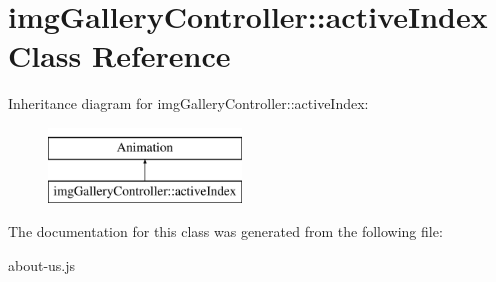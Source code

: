 \hypertarget{classimgGalleryController_1_1activeIndex}{\section{img\-Gallery\-Controller\-:\-:active\-Index Class Reference}
\label{classimgGalleryController_1_1activeIndex}
}
Inheritance diagram for img\-Gallery\-Controller\-:\-:active\-Index\-:\begin{figure}[H]
\begin{center}
\leavevmode
\includegraphics[height=2.000000cm]{classimgGalleryController_1_1activeIndex}
\end{center}
\end{figure}


The documentation for this class was generated from the following file\-:\begin{DoxyCompactItemize}
\item 
about-\/us.\-js\end{DoxyCompactItemize}
